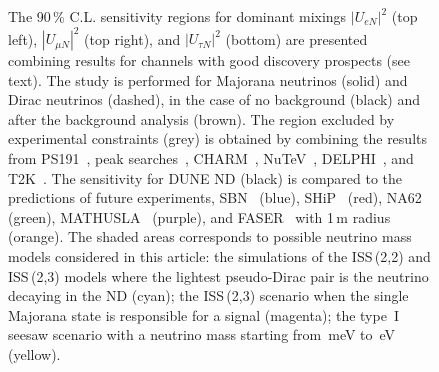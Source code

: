 \begin{figure}
	\centering
	\noindent{}

	\vspace{0.5em}
	{\resizebox{0.5\linewidth}{!}{}}
	\vspace{-0.2em}
	\caption{The 90\,\% C.L. sensitivity regions for dominant mixings %
		$|U_{e N}|^2$ (top left), $|U_{\mu N}|^2$ (top right), and $|U_{\tau N}|^2$ (bottom) are presented %
		combining results for channels with good discovery prospects (see text).
		The study is performed for Majorana neutrinos (solid) and Dirac neutrinos (dashed), %
		in the case of no background (black) and after the background analysis (brown).
		The region excluded by experimental constraints (grey) is obtained by combining the results from
		PS191~\cite{Bernardi:1985ny, Bernardi:1987ek}, %
		peak searches~\cite{Artamonov:2014urb, Britton:1992pg, Britton:1992xv, Aguilar-Arevalo:2017vlf, Aguilar-Arevalo:2019owf}, %
		CHARM~\cite{Vilain:1994vg}, NuTeV~\cite{Vaitaitis:1999wq}, DELPHI~\cite{Abreu:1996pa}, and T2K~\cite{Abe:2019kgx}.
		The sensitivity for DUNE ND (black) is compared to the predictions of future experiments, %
		SBN~\cite{Ballett:2016opr} (blue), %
		SHiP~\cite{Alekhin:2015byh} (red), NA62~\cite{Drewes:2018irr} (green), MATHUSLA~\cite{Curtin:2018mvb} (purple), %
		and FASER~\cite{Kling:2018wct} with 1\,m radius (orange).
		The shaded areas corresponds to possible neutrino mass models considered in this article: %
		the simulations of the ISS\,(2,2) and ISS\,(2,3) models where the lightest %
		pseudo-Dirac pair is the neutrino decaying in the ND (cyan); %
		the ISS\,(2,3) scenario when the single Majorana state is responsible for a signal (magenta); %
		the type~I seesaw scenario with a neutrino mass starting from \,meV to \,eV (yellow).}
	\label{fig:sensAll}
\end{figure}

